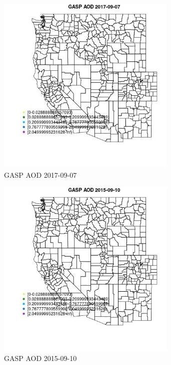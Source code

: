 \begin{figure} 
\centering  
\includegraphics[width=0.77\textwidth]{Code_Outputs/Report_ML_input_PM25_Step4_part_e_de_duplicated_aves_compiled_2019-05-20wNAs_MapObsGASP_AOD2017-09-07.jpg} 
\caption{\label{fig:Report_ML_input_PM25_Step4_part_e_de_duplicated_aves_compiled_2019-05-20wNAsMapObsGASP_AOD2017-09-07}GASP AOD 2017-09-07} 
\end{figure} 
 

\clearpage 

\begin{figure} 
\centering  
\includegraphics[width=0.77\textwidth]{Code_Outputs/Report_ML_input_PM25_Step4_part_e_de_duplicated_aves_compiled_2019-05-20wNAs_MapObsGASP_AOD2015-09-10.jpg} 
\caption{\label{fig:Report_ML_input_PM25_Step4_part_e_de_duplicated_aves_compiled_2019-05-20wNAsMapObsGASP_AOD2015-09-10}GASP AOD 2015-09-10} 
\end{figure} 
 

